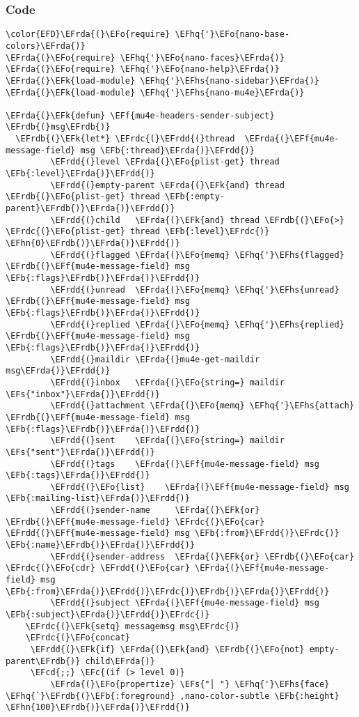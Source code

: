 \documentclass[a4wide,10pt]{article}
\newcommand{\EFc}[1]{\textcolor{EFc}{#1}} %
\newcommand{\EFcd}[1]{\textcolor{EFcd}{#1}} %
\newcommand{\EFs}[1]{\textcolor{EFs}{#1}} %
\newcommand{\EFk}[1]{\textcolor{EFk}{#1}} %
\newcommand{\EFb}[1]{\textcolor{EFb}{#1}} %
\newcommand{\EFf}[1]{\textcolor{EFf}{#1}} %
\newcommand{\EFo}[1]{\textcolor{EFo}{#1}} %
\newcommand{\EFhn}[1]{\textcolor{EFhn}{\textbf{#1}}} %
\newcommand{\EFhq}[1]{\textcolor{EFhq}{#1}} %
\newcommand{\EFhs}[1]{\textcolor{EFhs}{#1}} %
\newcommand{\EFrda}[1]{\textcolor{EFrda}{#1}} %
\newcommand{\EFrdb}[1]{\textcolor{EFrdb}{#1}} %
\newcommand{\EFrdc}[1]{\textcolor{EFrdc}{#1}} %
\newcommand{\EFrdd}[1]{\textcolor{EFrdd}{#1}} %
\begin{document}
\subsubsection{Code}
\label{sec:org6551a4e}
\begin{Code}
\begin{Verbatim}
\color{EFD}\EFrda{(}\EFo{require} \EFhq{'}\EFo{nano-base-colors}\EFrda{)}
\EFrda{(}\EFo{require} \EFhq{'}\EFo{nano-faces}\EFrda{)}
\EFrda{(}\EFo{require} \EFhq{'}\EFo{nano-help}\EFrda{)}
\EFrda{(}\EFk{load-module} \EFhq{'}\EFhs{nano-sidebar}\EFrda{)}
\EFrda{(}\EFk{load-module} \EFhq{'}\EFhs{nano-mu4e}\EFrda{)}

\EFrda{(}\EFk{defun} \EFf{mu4e-headers-sender-subject} \EFrdb{(}msg\EFrdb{)}
  \EFrdb{(}\EFk{let*} \EFrdc{(}\EFrdd{(}thread  \EFrda{(}\EFf{mu4e-message-field} msg \EFb{:thread}\EFrda{)}\EFrdd{)}
         \EFrdd{(}level \EFrda{(}\EFo{plist-get} thread \EFb{:level}\EFrda{)}\EFrdd{)}
         \EFrdd{(}empty-parent \EFrda{(}\EFk{and} thread \EFrdb{(}\EFo{plist-get} thread \EFb{:empty-parent}\EFrdb{)}\EFrda{)}\EFrdd{)}
         \EFrdd{(}child   \EFrda{(}\EFk{and} thread \EFrdb{(}\EFo{>} \EFrdc{(}\EFo{plist-get} thread \EFb{:level}\EFrdc{)} \EFhn{0}\EFrdb{)}\EFrda{)}\EFrdd{)}
         \EFrdd{(}flagged \EFrda{(}\EFo{memq} \EFhq{'}\EFhs{flagged}  \EFrdb{(}\EFf{mu4e-message-field} msg \EFb{:flags}\EFrdb{)}\EFrda{)}\EFrdd{)}
         \EFrdd{(}unread  \EFrda{(}\EFo{memq} \EFhq{'}\EFhs{unread}  \EFrdb{(}\EFf{mu4e-message-field} msg \EFb{:flags}\EFrdb{)}\EFrda{)}\EFrdd{)}
         \EFrdd{(}replied \EFrda{(}\EFo{memq} \EFhq{'}\EFhs{replied} \EFrdb{(}\EFf{mu4e-message-field} msg \EFb{:flags}\EFrdb{)}\EFrda{)}\EFrdd{)}
         \EFrdd{(}maildir \EFrda{(}mu4e-get-maildir msg\EFrda{)}\EFrdd{)}
         \EFrdd{(}inbox   \EFrda{(}\EFo{string=} maildir \EFs{"inbox"}\EFrda{)}\EFrdd{)}
         \EFrdd{(}attachment \EFrda{(}\EFo{memq} \EFhq{'}\EFhs{attach} \EFrdb{(}\EFf{mu4e-message-field} msg \EFb{:flags}\EFrdb{)}\EFrda{)}\EFrdd{)}
         \EFrdd{(}sent    \EFrda{(}\EFo{string=} maildir \EFs{"sent"}\EFrda{)}\EFrdd{)}
         \EFrdd{(}tags    \EFrda{(}\EFf{mu4e-message-field} msg \EFb{:tags}\EFrda{)}\EFrdd{)}
         \EFrdd{(}\EFo{list}    \EFrda{(}\EFf{mu4e-message-field} msg \EFb{:mailing-list}\EFrda{)}\EFrdd{)}
         \EFrdd{(}sender-name     \EFrda{(}\EFk{or} \EFrdb{(}\EFf{mu4e-message-field} \EFrdc{(}\EFo{car} \EFrdd{(}\EFf{mu4e-message-field} msg \EFb{:from}\EFrdd{)}\EFrdc{)} \EFb{:name}\EFrdb{)}\EFrda{)}\EFrdd{)}
         \EFrdd{(}sender-address  \EFrda{(}\EFk{or} \EFrdb{(}\EFo{car} \EFrdc{(}\EFo{cdr} \EFrdd{(}\EFo{car} \EFrda{(}\EFf{mu4e-message-field} msg \EFb{:from}\EFrda{)}\EFrdd{)}\EFrdc{)}\EFrdb{)}\EFrda{)}\EFrdd{)}
         \EFrdd{(}subject \EFrda{(}\EFf{mu4e-message-field} msg \EFb{:subject}\EFrda{)}\EFrdd{)}\EFrdc{)}
    \EFrdc{(}\EFk{setq} messagemsg msg\EFrdc{)}
    \EFrdc{(}\EFo{concat}
     \EFrdd{(}\EFk{if} \EFrda{(}\EFk{and} \EFrdb{(}\EFo{not} empty-parent\EFrdb{)} child\EFrda{)}
     \EFcd{;;} \EFc{(if (> level 0)}
         \EFrda{(}\EFo{propertize} \EFs{"│ "} \EFhq{'}\EFhs{face} \EFhq{`}\EFrdb{(}\EFb{:foreground} ,nano-color-subtle \EFb{:height} \EFhn{100}\EFrdb{)}\EFrda{)}\EFrdd{)}


\end{Verbatim}
\end{Code}
\end{document}
